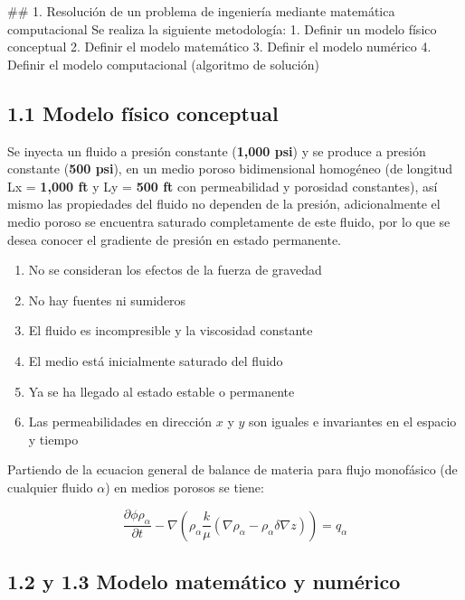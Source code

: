 \documentclass[
  letterpaper,
  DIV=11,
  numbers=noendperiod]{scrreprt}
\providecommand{\tightlist}{%
  \setlength{\itemsep}{0pt}\setlength{\parskip}{0pt}}\usepackage{longtable,booktabs,array}
\begin{document}
\#\# 1. Resolución de un problema de ingeniería mediante matemática
computacional Se realiza la siguiente metodología: 1. Definir un modelo
físico conceptual 2. Definir el modelo matemático 3. Definir el modelo
numérico 4. Definir el modelo computacional (algoritmo de solución)

\subsection{1.1 Modelo físico
conceptual}\label{modelo-fuxedsico-conceptual}

Se inyecta un fluido a presión constante (\textbf{1,000 psi}) y se
produce a presión constante (\textbf{500 psi}), en un medio poroso
bidimensional homogéneo (de longitud Lx = \textbf{1,000 ft} y Ly =
\textbf{500 ft} con permeabilidad y porosidad constantes), así mismo las
propiedades del fluido no dependen de la presión, adicionalmente el
medio poroso se encuentra saturado completamente de este fluido, por lo
que se desea conocer el gradiente de presión en estado permanente.

\begin{enumerate}
\def\labelenumi{\arabic{enumi}.}
\tightlist
\item
  No se consideran los efectos de la fuerza de gravedad
\item
  No hay fuentes ni sumideros
\item
  El fluido es incompresible y la viscosidad constante
\item
  El medio está inicialmente saturado del fluido
\item
  Ya se ha llegado al estado estable o permanente
\item
  Las permeabilidades en dirección \(x\) y \(y\) son iguales e
  invariantes en el espacio y tiempo
\end{enumerate}

Partiendo de la ecuacion general de balance de materia para flujo
monofásico (de cualquier fluido \(\alpha\)) en medios porosos se tiene:

\[\frac{\partial \phi\rho_\alpha}{\partial t} - \nabla (\rho_\alpha \frac{k}{\mu}(\nabla\rho_\alpha - \rho_\alpha \delta\nabla z)) = q_\alpha\]

\subsection{1.2 y 1.3 Modelo matemático y
numérico}\label{y-1.3-modelo-matemuxe1tico-y-numuxe9rico}
\end{document}
